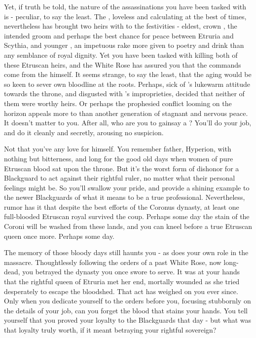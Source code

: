 \documentclass[char]{Kos}
\begin{document}
    Yet, if truth be told, the nature of the assassinations you have been tasked with is - peculiar, to say the least. The \cEtruriaKing{\monarch}, loveless and calculating at the best of times, nevertheless has brought \cEtruriaKing{\their} two heirs with \cEtruriaKing{\them} to the festivities - \cEtruriaKing{\their} eldest, crown \cGroom{\Prince} \cGroom{}, the intended groom and perhaps the best chance for peace between Etruria and Scythia, and \cEtruriaKing{\their} younger \cPoet{\offspring} \cPoet{}, an impetuous rake more given to poetry and drink than any semblance of royal dignity. Yet you have been tasked with killing both of these Etruscan heirs, and the White Rose has assured you that the commands come from the \cEtruriaKing{\monarch} himself. It seems strange, to say the least, that the aging \cEtruriaKing{} would be so keen to sever \cEtruriaKing{\their} own bloodline at the roots. Perhaps, sick of \cGroom{}'s lukewarm attitude towards the throne, and disgusted with \cPoet{}'s improprieties, \cEtruriaKing{\they} decided that neither of them were worthy heirs. Or perhaps the prophesied conflict looming on the horizon appeals more to \cEtruriaKing{} than another generation of stagnant and nervous peace. It doesn't matter to you. After all, who are you to gainsay a \cEtruriaKing{\monarch}? You'll do your job, and do it cleanly and secretly, arousing no suspicion. 

    Not that you've any love for \cEtruriaKing{} himself. You remember \cEtruriaKing{\their} father, Hyperion, with nothing but bitterness, and long for the good old days when women of pure Etruscan blood sat upon the throne. But it's the worst form of dishonor for a Blackguard to act against their rightful ruler, no matter what their personal feelings might be. So you'll swallow your pride, and provide a shining example to the newer Blackguards of what it means to be a true professional. Nevertheless, rumor has it that despite the best efforts of the Coronus dynasty, at least one full-blooded Etruscan royal survived the coup. Perhaps some day the stain of the Coroni will be washed from these lands, and you can kneel before a true Etruscan queen once more. Perhaps some day.

The memory of those bloody days still haunts you - as does your own role in the massacre. Thoughtlessly following the orders of a past White Rose, now long-dead, you betrayed the dynasty you once swore to serve. It was at your hands that the rightful queen of Etruria met her end, mortally wounded as she tried desperately to escape the bloodshed. That act has weighed on you ever since. Only when you dedicate yourself to the orders before you, focusing stubbornly on the details of your job, can you forget the blood that stains your hands. You tell yourself that you proved your loyalty to the Blackguards that day - but what was that loyalty truly worth, if it meant betraying your rightful sovereign?
\end{document}
